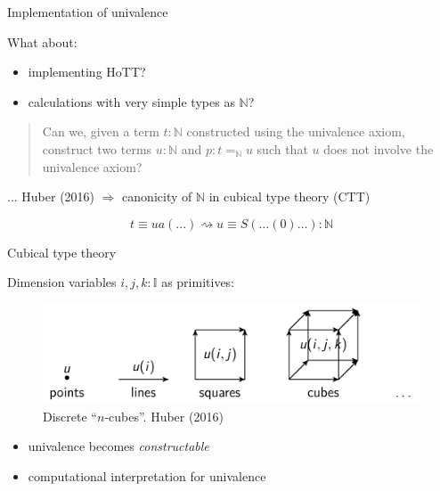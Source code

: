 \documentclass[english]{beamer}
\begin{document}
\begin{frame}{Implementation of univalence}

What about:
\begin{itemize}
\item implementing HoTT?
\item calculations with very simple types as $\mathbb{N}$?
\end{itemize}

\begin{quotation}
Can we, given a term $t: \mathbb{N}$ constructed using the univalence axiom, construct two terms $u : \mathbb{N}$ and $p : t =_{\mathbb{N}} u$ such that $u$ does not involve the univalence axiom?
\end{quotation}

\pause

... Huber (2016) $\Rightarrow$ canonicity of $\mathbb{N}$ in cubical type theory (CTT)

$$ t \equiv ua ( ... )  \rightsquigarrow u \equiv S ( \dots ( 0 ) \ldots ) : \mathbb{N}  $$


\end{frame}


\begin{frame}{Cubical type theory}

Dimension variables $i,j,k : \mathbb{I}$ as primitives:

\begin{figure}[h!]
    \includegraphics[width=.7\textwidth]{figures/cubes.png}
    \caption{Discrete ``$n$-cubes''. Huber (2016)}
\end{figure}

\begin{itemize}
\item univalence becomes \emph{constructable}
\item computational interpretation for univalence 
\end{itemize}

\end{frame}
\end{document}
